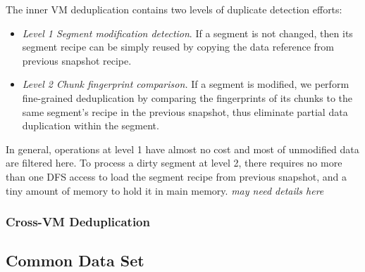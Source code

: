 The inner VM deduplication contains two levels of duplicate detection efforts:
\begin{itemize}
\item \textit{Level 1 Segment modification detection}.
If a segment is not changed, then its segment recipe can be simply reused by copying the data
reference from previous snapshot recipe. 
\item \textit{Level 2  Chunk fingerprint comparison.}
If a segment is modified, we perform fine-grained deduplication 
by comparing the fingerprints of its chunks to the same segment's recipe in the previous snapshot,
thus eliminate partial data duplication within the segment.
\end{itemize}

In general, operations at level 1 have almost no cost and most of unmodified data are filtered here. 
To process a dirty segment at level 2, 
there requires no more than one DFS access to load the segment recipe from previous snapshot,
and a tiny amount of memory to hold it in main memory.
\textit{may need details here}

\subsubsection{Cross-VM Deduplication}
\label{sect:CrossVM}

\subsection{Common Data Set}
